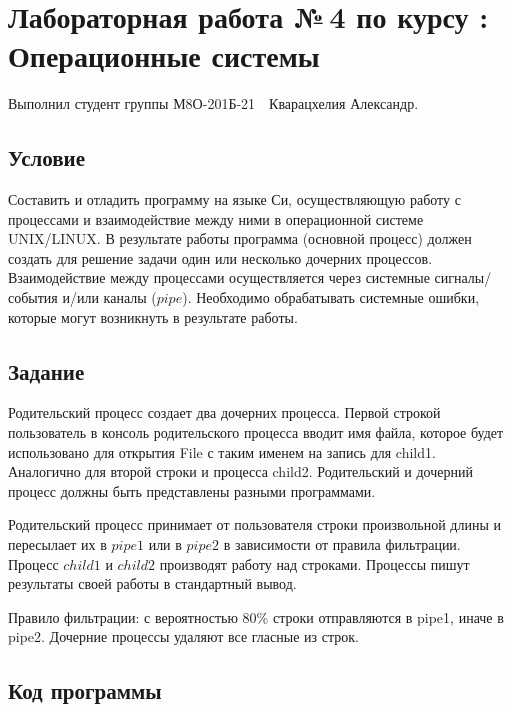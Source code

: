 \documentclass[12pt]{article}
\begin{document}
	
	\section*{\centering Лабораторная работа №\,4 по курсу :\\ Операционные системы}
	
	Выполнил студент группы М8О-201Б-21 \,\, Кварацхелия Александр.
	
	\subsection*{Условие}
	
	Составить и отладить программу на языке Си, осуществляющую работу с процессами и
	взаимодействие между ними в операционной системе UNIX/LINUX. В результате работы
	программа (основной процесс) должен создать для решение задачи один или несколько
	дочерних процессов. Взаимодействие между процессами осуществляется через системные
	сигналы/события и/или каналы ($pipe$).
	Необходимо обрабатывать системные ошибки, которые могут возникнуть в результате работы.
	
	\subsection*{Задание}
	
	Родительский процесс создает два дочерних процесса. Первой строкой пользователь в консоль
	родительского процесса вводит имя файла, которое будет использовано для открытия File с таким
	именем на запись для child1. Аналогично для второй строки и процесса child2. Родительский и
	дочерний процесс должны быть представлены разными программами.
	
	\par 
	
	Родительский процесс принимает от пользователя строки произвольной длины и пересылает их в
	$pipe1$ или в $pipe2$ в зависимости от правила фильтрации. Процесс $child1$ и $child2$ производят работу
	над строками. Процессы пишут результаты своей работы в стандартный вывод.
	
	\par 
	
	Правило фильтрации: с вероятностью 80\% строки отправляются в pipe1, иначе в pipe2.
	Дочерние процессы удаляют все гласные из строк.
	
	\subsection*{Код программы}
	
\end{document}
